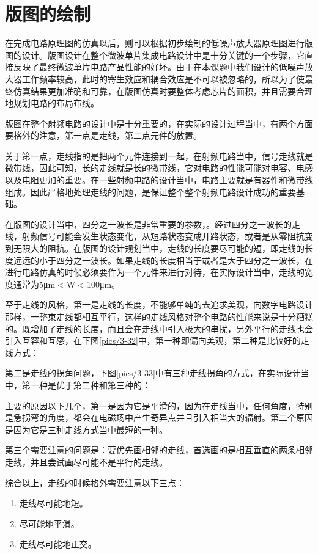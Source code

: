 \section{版图的绘制}
在完成电路原理图的仿真以后，则可以根据初步绘制的低噪声放大器原理图进行版图的设计。版图设计在整个微波单片集成电路设计中是十分关键的一个步骤，它直接反映了最终微波单片电路产品性能的好坏。由于在本课题中我们设计的低噪声放大器工作频率较高，此时的寄生效应和耦合效应是不可以被忽略的，所以为了使最终仿真结果更加准确和可靠，在版图仿真时要整体考虑芯片的面积，并且需要合理地规划电路的布局布线。

版图在整个射频电路的设计中是十分重要的，在实际的设计过程当中，有两个方面要格外的注意，第一点是走线，第二点元件的放置。

关于第一点，走线指的是把两个元件连接到一起，在射频电路当中，信号走线就是微带线，因此可知，长的走线就是长的微带线，它对电路的性能可能对电容、电感以及电阻更加的重要。在一些射频电路的设计当中，电路主要就是有器件和微带线组成。因此严格地处理走线的问题，是保证整个整个射频电路设计成功的重要基础。

在版图的设计当中，四分之一波长是非常重要的参数，。经过四分之一波长的走线，射频信号可能会发生状态变化，从短路状态变成开路状态，或者是从零阻抗变到无限大的阻抗。在版图的设计规划当中，走线的长度要尽可能的短，即走线的长度远远的小于四分之一波长。如果走线的长度相当于或者是大于四分之一波长，在进行电路仿真的时候必须要作为一个元件来进行对待，在实际设计当中，走线的宽度通常为5μm$<$W$<$100μm。

至于走线的风格，第一是走线的长度，不能够单纯的去追求美观，向数字电路设计那样，一整束走线都相互平行，这样的走线风格对整个电路的性能来说是十分糟糕的。既增加了走线的长度，而且会在走线中引入极大的串扰，另外平行的走线也会引入互容和互感，在下图\ref{pics/3-32}中，第一种即偏向美观，第二种是比较好的走线方式：


第二是走线的拐角问题，下图\ref{pics/3-33}中有三种走线拐角的方式，在实际设计当中，第一种是优于第二种和第三种的：


主要的原因以下几个，第一是因为它是平滑的，因为在走线当中，任何角度，特别是急拐弯的角度，都会在电磁场中产生奇异点并且引入相当大的辐射。第二个原因是因为它是三种走线方式当中最短的一种。

第三个需要注意的问题是：要优先画相邻的走线，首选画的是相互垂直的两条相邻走线，并且尝试画尽可能不是平行的走线。 

综合以上，走线的时候格外需要注意以下三点：
\begin{enumerate}
	\item 走线尽可能地短。
	\item 尽可能地平滑。
	\item 走线尽可能地正交。
\end{enumerate}

